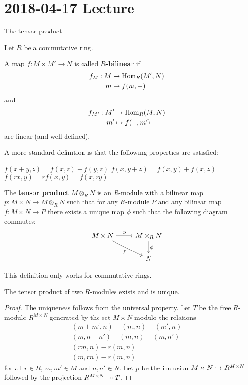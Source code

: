 \section{2018-04-17 Lecture}

The tensor product

\begin{defn}[1.24]
	Let $R$ be a commutative ring.
	\begin{enum}
		\io
		A map $f: M \times M' \to N$ is called \textbf{$R$-bilinear} if
		\begin{align*}
			f_M: M &\to \operatorname{Hom}_R(M',N) \\
			m &\mapsto f(m,-)
		\end{align*}
		and
		\begin{align*}
			f_{M'}: M' &\to \operatorname{Hom}_R(M,N) \\
			m' &\mapsto f(-,m')
		\end{align*}
		are linear (and well-defined).
		
		A more standard definition is that the following properties are satisfied:
		\begin{enum}
			\io $f(x+y,z)=f(x,z)+f(y,z)$
			\io $f(x,y+z)=f(x,y)+f(x,z)$
			\io $f(rx,y)=rf(x,y)=f(x,ry)$
		\end{enum}
		
		\io
		The \textbf{tensor product} $M \otimes_R N$ is an $R$-module with a bilinear map $p: M \times N \to M \otimes_R N$ such that for any $R$-module $P$ and any bilinear map $f:M \times N \to P$ there exists a unique map $\phi$ such that the following diagram commutes:
		\[\begin{tikzcd}
			M \times N \ar[r, "p"] \ar[dr, "f", swap] & M \ar[d, "\phi"] \otimes_R N \\
			& N
		\end{tikzcd}\]
	\end{enum}
\end{defn}

\begin{rmk}
	This definition only works for commutative rings.
\end{rmk}

\begin{prop}[1.25]
	The tensor product of two $R$-modules exists and is unique.
\end{prop}

\begin{proof}
	The uniqueness follows from the universal property.
	Let $T$ be the free $R$-module $R^{M \times N}$ generated by the set $M \times N$ modulo the relations
	\begin{gather*}
		(m+m',n)-(m,n)-(m',n) \\
		(m,n+n')-(m,n)-(m,n') \\
		(rm,n) - r(m,n) \\
		(m,rn) - r(m,n)
	\end{gather*}
	for all $r \in R$, $m,m' \in M$ and $n,n' \in N$.
	Let $p$ be the inclusion $M \times N \hookrightarrow R^{M \times N}$ followed by the projection $R^{M \times N} \twoheadrightarrow T$.
\end{proof}

